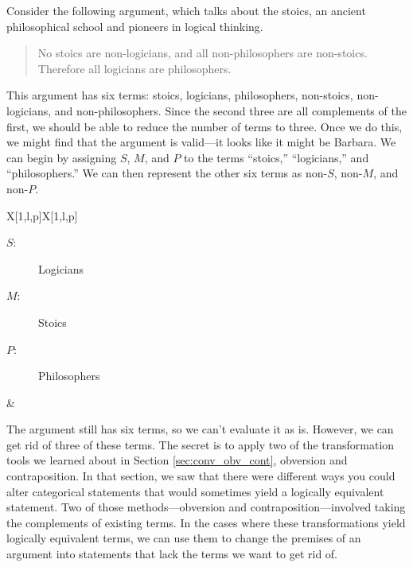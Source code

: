  Consider the following argument, which talks about the stoics, an ancient philosophical school and pioneers in logical thinking. 

\begin{quotation}
No stoics are non-logicians, and all non-philosophers are non-stoics. Therefore all logicians are philosophers.
\end{quotation}

This argument has six terms: stoics, logicians, philosophers, non-stoics, non-logicians, and non-philosophers. Since the second three are all complements of the first, we should be able to reduce the number of terms to three. Once we do this, we might find that the argument is valid---it looks like it might be Barbara. We can begin by assigning $S$, $M$, and $P$ to the terms ``stoics,'' ``logicians,'' and ``philosophers.'' We can then represent the other six terms as non-$S$, non-$M$, and non-$P$.


\begin{tabu}{{X[1,l,p]X[1,l,p]}}

\begin{description}
\item[$S$:] Logicians
\item[$M$:] Stoics
\item[$P$:] Philosophers
\end{description}

&

\begin{kormanize}
\end{kormanize}

\end{tabu}

The argument still has six terms, so we can't evaluate it as is. However, we can get rid of three of these terms. The secret is to apply two of the transformation tools we learned about in Section \ref{sec:conv_obv_cont}, obversion and contraposition. In that section, we saw that there were different ways you could alter categorical statements that would sometimes yield a logically equivalent statement. Two of those methods---obversion and contraposition---involved taking the complements of existing terms. In the cases where these transformations yield logically equivalent terms, we can use them to change the premises of an argument into statements that lack the terms we want to get rid of.

